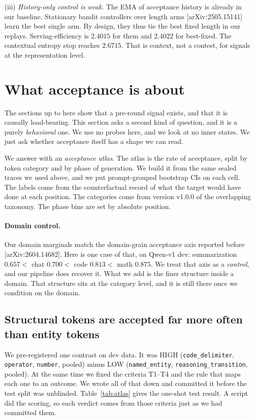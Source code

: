 \documentclass[11pt]{article}
\begin{document}
(iii) \emph{History-only control is weak.} The EMA of acceptance history is
already in our baseline. Stationary bandit controllers over length arms
[arXiv:2505.15141] learn the best single arm. By design, they thus tie the
best fixed length in our replays. Serving-efficiency is $2.4015$ for them and
$2.4022$ for best-fixed. The contextual entropy stop reaches $2.6715$. That is
context, not a contest, for signals at the representation level.

\section{What acceptance is about}
\label{sec:atlas}

The sections up to here show that a pre-round signal exists, and that it is
causally load-bearing. This section asks a second kind of question, and it is
a purely \emph{behavioral} one. We use no probes here, and we look at no inner
states. We just ask whether acceptance itself has a shape we can read.

We answer with an \emph{acceptance atlas}. The atlas is the rate of
acceptance, split by token category and by phase of generation. We build it
from the same sealed traces we used above, and we put prompt-grouped bootstrap
CIs on each cell. The labels come from the counterfactual record of what the
target would have done at each position. The categories come from version
v1.0.0 of the overlapping taxonomy. The phase bins are set by absolute
position.

\paragraph{Domain control.} Our domain marginals match the domain-grain
acceptance axis reported before [arXiv:2604.14682]. Here is one case of that,
on Qwen-v1 dev: summarization $0.657 <$ chat $0.700 <$ code $0.813 <$ math
$0.875$. We treat that axis as a \emph{control}, and our pipeline does recover
it. What we add is the finer structure inside a domain. That structure sits at
the category level, and it is still there once we condition on the domain.

\subsection{Structural tokens are accepted far more often than entity tokens}
\label{sec:atlas-contrast}

We pre-registered one contrast on dev data. It was HIGH
(\texttt{code\_delimiter}, \texttt{operator}, \texttt{number}, pooled) minus
LOW (\texttt{named\_entity}, \texttt{reasoning\_transition}, pooled). At the
same time we fixed the criteria T1--T4 and the rule that maps each one to an
outcome. We wrote all of that down and committed it before the test split was
unblinded. Table~\ref{tab:atlas} gives the one-shot test result. A script did
the scoring, so each verdict comes from those criteria just as we had
committed them.
\end{document}
